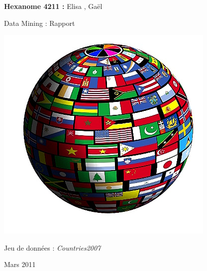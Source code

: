 \documentclass[a4paper]{article}
\begin{document}
\begin{titlepage}
\begin{center}
 
 \vfill
		\begin{Large}\textbf{Hexanome 4211 :} 
		Elisa , Gaël \end{Large}
		
\vfill
	
		\begin{Huge}
		Data Mining : Rapport \\
		\end{Huge} 

\vfill
	
		 
		\includegraphics[scale=1]{Image/drapeaux-du-monde}
\begin{Large}
		
		
		Jeu de données :  \textit{Countries2007}\\
		\end{Large}

\vfill		
		\begin{Large}
		Mars 2011
		\end{Large}
	\end{center}

\end{titlepage}

\newpage
\tableofcontents
\newpage


\end{document}
